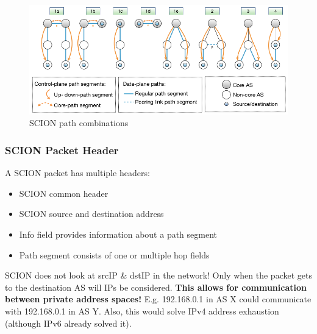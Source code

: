 \documentclass[11pt,oneside,a4paper]{article}
\begin{document}
\begin{figure}[hb]
	\centering
	\includegraphics[width=0.8\linewidth]{figures/scion_path_combinations}
	\caption{SCION path combinations}
	\label{fig:scionpathcombinations}
\end{figure}

\newpage

\subsubsection{SCION Packet Header}

A SCION packet has multiple headers:

\vspace{-\topsep}
\begin{itemize}
	\setlength{\itemsep}{0pt}
	\setlength{\parskip}{0pt}
	\item SCION common header
	\item SCION source and destination address
	\item Info field provides information about a path segment
	\item Path segment consists of one or multiple hop fields
\end{itemize}
\vspace{-\topsep}

\noindent SCION does not look at srcIP \& dstIP in the network! Only when the packet gets to the destination AS will IPs be considered. \textbf{This allows for communication between private address spaces!} E.g. 192.168.0.1 in AS X could communicate with 192.168.0.1 in AS Y. Also, this would solve IPv4 address exhaustion (although IPv6 already solved it).
\end{document}
